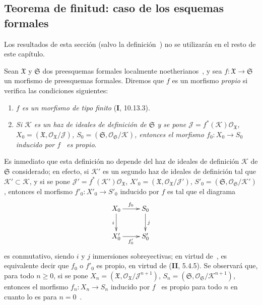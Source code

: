 \subsection{Teorema de finitud: caso de los esquemas formales}
\label{subsection:III.3.4}
\label{subsection:III.3.4-fr}

Los resultados de esta sección (salvo la definición~) no se utilizarán en el resto de este capítulo.

\begin{env}[3.4.1]
\label{III.3.4.1}
\label{III.3.4.1-fr}
Sean $\mathfrak X$ y $\mathfrak S$ dos preesquemas formales localmente noetherianos~, y sea $f:\mathfrak X\to\mathfrak S$ un morfismo de preesquemas formales.
Diremos que $f$ es un morfismo \emph{propio} si
verifica las condiciones siguientes:
\begin{enumerate}
\item[$1^\circ$] \emph{$f$ es un morfismo de tipo finito} (\textbf{I}, 10.13.3).
\item[$2^\circ$] \emph{Si $\mathcal K$ es un haz de ideales de definición de $\mathfrak S$ y se pone $\mathcal J=f^*(\mathcal K)\mathcal O_{\mathfrak X}$, $X_0=(\mathfrak X,\mathcal O_{\mathfrak X}/\mathcal J)$, $S_0=(\mathfrak S,\mathcal O_{\mathfrak S}/\mathcal K)$, entonces el morfismo $f_0:X_0\to S_0$ inducido por $f$~ es propio}.
\end{enumerate}
Es inmediato que esta definición no depende del haz de ideales de definición $\mathcal K$ de $\mathfrak S$ considerado; en efecto, si $\mathcal K'$ es un segundo haz de ideales de definición tal que $\mathcal K'\subset\mathcal K$, y si se pone $\mathcal J'=f^*(\mathcal K')\mathcal O_{\mathfrak X}$, $X'_0=(\mathfrak X,\mathcal O_{\mathfrak X}/\mathcal J')$, $S'_0=(\mathfrak S,\mathcal O_{\mathfrak S}/\mathcal K')$, entonces el morfismo $f'_0:X'_0\to S'_0$ inducido por $f$ es tal que el diagrama
\[
\xymatrix{
X_0\ar[r]^{f_0}\ar[d]_i & S_0\ar[d]^j\\
X'_0\ar[r]_{f'_0} & S'_0
}
\]
es conmutativo, siendo $i$ y $j$ inmersiones sobreyectivas; en virtud de~, es equivalente decir que $f_0$ o $f'_0$ es propio, en virtud de (\textbf{II}, 5.4.5). Se observará que, para todo $n\geq0$, si se pone $X_n=(\mathfrak X,\mathcal O_{\mathfrak X}/\mathcal J^{n+1})$, $S_n=(\mathfrak S,\mathcal O_{\mathfrak S}/\mathcal K^{n+1})$, entonces el morfismo $f_n:X_n\to S_n$ inducido por $f$~ es propio para todo $n$ en cuanto lo es para $n=0$~.


\end{env}

